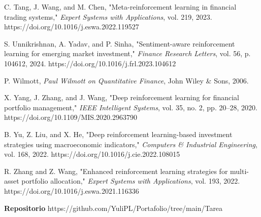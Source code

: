 \documentclass[conference]{IEEEtran}
\begin{document}
\begin{thebibliography}{30}
		C. Tang, J. Wang, and M. Chen, "Meta-reinforcement learning in financial trading systems," \textit{Expert Systems with Applications}, vol. 219, 2023. https://doi.org/10.1016/j.eswa.2022.119527
		
		S. Unnikrishnan, A. Yadav, and P. Sinha, "Sentiment-aware reinforcement learning for emerging market investment," \textit{Finance Research Letters}, vol. 56, p. 104612, 2024. https://doi.org/10.1016/j.frl.2023.104612
		
		P. Wilmott, \textit{Paul Wilmott on Quantitative Finance}, John Wiley \& Sons, 2006.
		
		X. Yang, J. Zhang, and J. Wang, "Deep reinforcement learning for financial portfolio management," \textit{IEEE Intelligent Systems}, vol. 35, no. 2, pp. 20–28, 2020. https://doi.org/10.1109/MIS.2020.2963790
		
		B. Yu, Z. Liu, and X. He, "Deep reinforcement learning-based investment strategies using macroeconomic indicators," \textit{Computers \& Industrial Engineering}, vol. 168, 2022. https://doi.org/10.1016/j.cie.2022.108015
		
		R. Zhang and Z. Wang, "Enhanced reinforcement learning strategies for multi-asset portfolio allocation," \textit{Expert Systems with Applications}, vol. 193, 2022. https://doi.org/10.1016/j.eswa.2021.116336
		
		
	\end{thebibliography}
	
	\textbf{Repositorio}  
	https://github.com/YuliPL/Portafolio/tree/main/Tarea%
	
\end{document}
